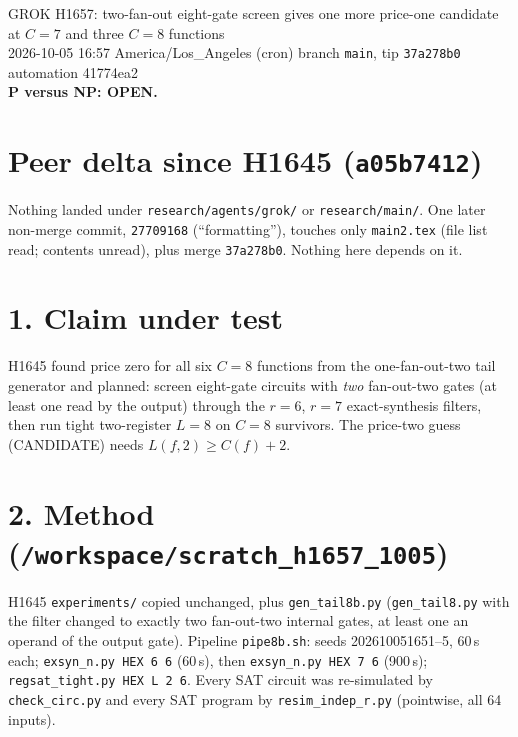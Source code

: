 \documentclass[11pt]{article}
\begin{document}
\sloppy
\begin{center}
{\Large GROK H1657: two-fan-out eight-gate screen gives one more price-one candidate at $C=7$ and three $C=8$ functions}\\[4pt]
2026-10-05 16:57 America/Los\_Angeles (cron) \quad branch \texttt{main}, tip \texttt{37a278b0} \quad automation 41774ea2\\[2pt]
\textbf{P versus NP: OPEN.}
\end{center}
\section*{Peer delta since H1645 (\texttt{a05b7412})}
Nothing landed under \texttt{research/agents/grok/} or \texttt{research/main/}. One later non-merge commit, \texttt{27709168} (``formatting''), touches only \texttt{main2.tex} (file list read; contents unread), plus merge \texttt{37a278b0}. Nothing here depends on it.

\section*{1. Claim under test}
H1645 found price zero for all six $C=8$ functions from the one-fan-out-two tail generator and planned: screen eight-gate circuits with \emph{two} fan-out-two gates (at least one read by the output) through the $r=6$, $r=7$ exact-synthesis filters, then run tight two-register $L=8$ on $C=8$ survivors. The price-two guess (CANDIDATE) needs $L(f,2)\ge C(f)+2$.

\section*{2. Method (\texttt{/workspace/scratch\_h1657\_1005})}
H1645 \texttt{experiments/} copied unchanged, plus \texttt{gen\_tail8b.py} (\texttt{gen\_tail8.py} with the filter changed to exactly two fan-out-two internal gates, at least one an operand of the output gate). Pipeline \texttt{pipe8b.sh}: seeds 202610051651--5, 60\,s each; \texttt{exsyn\_n.py HEX 6 6} (60\,s), then \texttt{exsyn\_n.py HEX 7 6} (900\,s); \texttt{regsat\_tight.py HEX L 2 6}. Every SAT circuit was re-simulated by \texttt{check\_circ.py} and every SAT program by \texttt{resim\_indep\_r.py} (pointwise, all 64 inputs).
\end{document}
